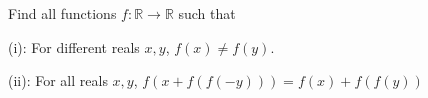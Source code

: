 Find all functions $f: \mathbb{R} \rightarrow \mathbb{R}$ such that

(i): For different reals $x,y$, $f(x) \not= f(y)$.

(ii): For all reals $x,y$, $f(x+f(f(-y)))=f(x)+f(f(y))$